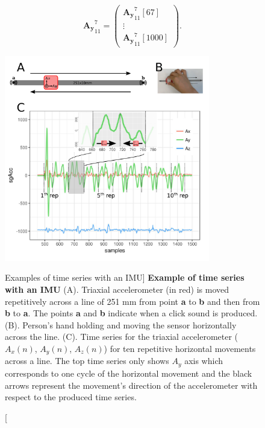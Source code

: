 \begin{equation} \label{eq:etde3_exampleA2}
\boldsymbol{{A_y}}^{7}_{11}  = 
\begin{pmatrix}
\boldsymbol{{A_y}}^{7}_{11}[67] \\
\vdots \\
\boldsymbol{{A_y}}^{7}_{11}[1000] 
\end{pmatrix}.
\end{equation}


\begin{figure}
 \centering
   \includegraphics[width=0.8\textwidth]{hmov}
   \caption
	[Examples of time series with an IMU]{
	{\bf Example of time series with an IMU}
	(A). Triaxial accelerometer (in red) is moved repetitively across a line
   	of 251 mm from point \textbf{a} to \textbf{b} and then from
   	\textbf{b} to \textbf{a}. 
   	The points \textbf{a} and \textbf{b} indicate when a click 
	sound is produced.
	(B). Person's hand holding and moving the sensor horizontally 
	across the line.
	(C). Time series for the triaxial accelerometer 
	($A_x(n)$, $A_y(n)$, $A_z(n)$) for ten repetitive horizontal 
	movements across a line. The top time series only
   	shows $A_y$ axis which corresponds to one cycle of the 
	horizontal movement and the black arrows represent the 
	movement's direction of the accelerometer with respect 
	to the produced time series.
	}
   \label{fig:acc}
\end{figure}



